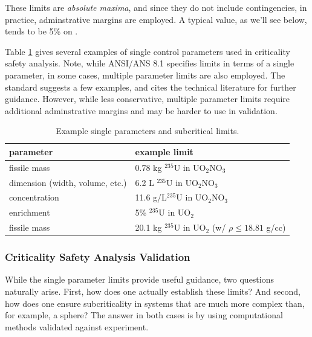 These limits are \textit{absolute maxima}, and since they do not include 
contingencies, in practice, adminstrative margins are employed.  A typical 
value, as we'll see below, tends to be 5\% on \keff.

Table \ref{tbl:controlparams} gives several examples of single control 
parameters used in criticality safety analysis.  Note, while ANSI/ANS 8.1 
specifies limits in terms of a single parameter, in some cases, multiple 
parameter limits are also employed.  The standard suggests a few examples, and
cites the technical literature for further guidance. However, while less 
conservative, multiple 
parameter limits require additional adminstrative margins and may be harder to 
use in validation.

\begin{table}[ht]
    \caption{Example single parameters and subcritical limits.}
    \begin{center} 
    \begin{tabular*}{0.90\textwidth}{@{\extracolsep{\fill}} ll } 
      \toprule 
	parameter &  example limit \\
      \midrule
       fissile mass                    &  0.78 kg ${}^{235}$U in UO$_2$NO$_3$ \\
       dimension (width, volume, etc.) &  6.2   L ${}^{235}$U in UO$_2$NO$_3$ \\
       concentration                   &  11.6 g/L${}^{235}$U in UO$_2$NO$_3$ \\
       enrichment                      &  5\%     ${}^{235}$U in UO$_2$       \\
       fissile mass                    &  20.1 kg ${}^{235}$U in UO$_2$ 
                                          (w/ $\rho \leq 18.81$ g/cc) \\
      \bottomrule 
    \end{tabular*} 
    \end{center} 
    \label{tbl:controlparams}
\end{table}



\subsubsection*{Criticality Safety Analysis Validation}

While the single parameter limits provide useful guidance, two questions 
naturally arise.  First, how does one actually establish these limits?  And 
second, how does one ensure subcriticality in systems that are much more 
complex than, for example, a sphere?  The answer in both cases is by using 
computational methods validated against experiment.


